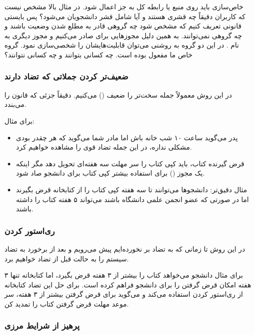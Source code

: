 خاص‌سازی باید روی منبع یا رابطه کل به جز اعمال شود. در مثال بالا مشخص نیست که
کاربران دقیقاً چه قشری هستند و آیا شامل قشر دانشجویان می‌شود؟ پس بایستی قانونی
تعریف کنیم که مشخص شود چه گروهی قادر به مطلع شدن وضعیت باشند و چه گروهی
نمی‌توانند. به همین دلیل مجوز‌هایی برای  صادر می‌کنیم و مجوز
دیگری به نام . در این دو گروه به روشنی می‌توان قابلیت‌هایشان را
شخصی‌سازی نمود. گروه خاص ما مفعول بوده است. چه کسانی بتوانند و چه کسانی نتوانند؟

\subsubsection{ضعیف‌تر کردن جملاتی که تضاد دارند}

در این روش معمولاً جمله سخت‌تر را ضعیف () می‌کنیم. دقیقاً جزئی که قانون
را می‌بندد.

برای مثال:

\begin{itemize}
    \item پدر می‌گوید ساعت ۱۰ شب خانه باش اما مادر شما می‌گوید که هر چقدر بودی
    مشکلی نداره، در این جمله تضاد قوی را مشاهده خواهیم کرد.
    \item قرض گیرنده کتاب، باید کپی کتاب را سر مهلت سه هفته‌ای تحویل دهد مگر
    اینکه یک مجوز () برای استفاده بیشتر کپی کتاب برای دانشجو صاد
    شود.
    \item مثال دقیق‌تر: دانشجو‌ها می‌توانند تا سه هفته کپی کتاب را از کتابخانه
    قرض بگیرند اما در صورتی که عضو انجمن علمی دانشگاه باشند می‌تواند ۵ هفته کتاب
    را داشته باشند.
\end{itemize}

\subsubsection{ری‌استور کردن}

در این روش تا زمانی که به تضاد بر نخورده‌ایم پیش می‌رویم و بعد از برخورد به تضاد
سیستم را به حالت قبل از تضاد خواهیم برد.

برای مثال دانشجو می‌خواهد کتاب را بیشتر از ۳ هفته قرض بگیرد، اما کتابخانه تنها ۳
هفته امکان قرض گرفتن را برای دانشجو فراهم کرده است. برای حل این تضاد کتابخانه از
ری‌استور کردن استفاده می‌کند و می‌گوید برای قرض گرفتن بیشتر از ۳ هفته، سر موعد
مهلت قرض گرفتن کتاب را تمدید کن.

\subsubsection{پرهیز از شرایط مرزی}

